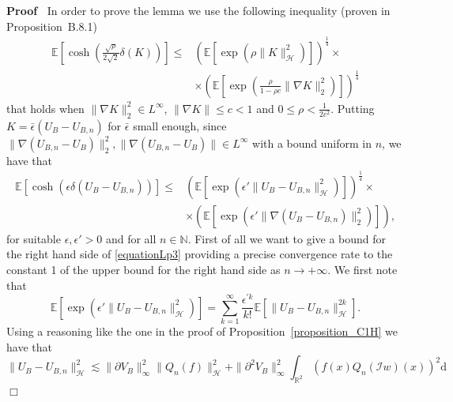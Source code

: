 \documentclass[a4paper,10pt]{article}
\newcommand{\mathd}{\mathrm{d}}
\newenvironment{proof}{\noindent\textbf{Proof\ }}{\hspace*{\fill}$\Box$\medskip}
\begin{document}
\begin{proof}
  In order to prove the lemma we use the following inequality (proven in
  {\cite{Ustunel2000}} Proposition~B.8.1)
  \begin{equation}
    \begin{aligned}
      \mathbb{E} \left[ \cosh \left( \frac{\sqrt{\rho}}{2 \sqrt{2}} \delta (K)
      \right) \right] \leqslant & (\mathbb{E} [\exp (\rho \| K
      \|^2_{\mathcal{H}})])^{\frac{1}{4}} \times\\
      & \times \left( \mathbb{E} \left[ \exp \left( \frac{\rho}{1 - \rho c}
      \| \nabla K \|^2_2 \right) \right] \right)^{\frac{1}{4}}
    \end{aligned}
    \label{equationinequalitynew}
  \end{equation}
  that holds when $\| \nabla K \|^2_2 \in L^{\infty}$, $\| \nabla K \|
  \leqslant c < 1$ and $0 \leqslant \rho < \frac{1}{2 c^2}$. Putting $K =
  \bar{\epsilon} (U_B - U_{B, n})$ for $\bar{\epsilon}$ small enough, since
  $\| \nabla (U_{B, n} - U_B) \|^2_2, \| \nabla (U_{B, n} - U_B) \| \in
  L^{\infty}$ with a bound uniform in $n$, we have that
  \begin{equation}
    \begin{aligned}
      \mathbb{E} [\cosh (\epsilon \delta (U_B - U_{B, n}))] \leqslant &
      (\mathbb{E} [\exp (\epsilon' \| U_B - U_{B, n}
      \|^2_{\mathcal{H}})])^{\frac{1}{4}} \times\\
      & \times (\mathbb{E} [\exp (\epsilon' \| \nabla (U_B - U_{B, n})
      \|^2_2)]),
    \end{aligned}
    \label{equationLp3}
  \end{equation}
  for suitable $\epsilon, \epsilon' > 0$ and for all $n \in \mathbb{N}$. First
  of all we want to give a bound for the right hand side of
  {\eqref{equationLp3}} providing a precise convergence rate to the constant 1
  of the upper bound for the right hand side as $n \rightarrow + \infty$. We
  first note that
  \begin{equation}
    \mathbb{E} [\exp (\epsilon' \| U_B - U_{B, n} \|^2_{\mathcal{H}})] =
    \sum_{k = 1}^{\infty} \frac{\epsilon^{\prime k}}{k!} \mathbb{E} [\| U_B -
    U_{B, n} \|^{2 k}_{\mathcal{H}}] . \label{equationLp4}
  \end{equation}
  Using a reasoning like the one in the proof of
  Proposition~\ref{proposition_C1H} we have that
  \[ \| U_B - U_{B, n} \|^2_{\mathcal{H}} \lesssim \| \partial V_B
     \|^2_{\infty} \| Q_n (f) \|_{\mathcal{H}}^2 + \| \partial^2 V_B
     \|^2_{\infty} \int_{\mathbb{R}^2} (f (x) Q_n (\mathcal{I}w) (x))^2 \mathd
\]
\end{proof}
\end{document}
